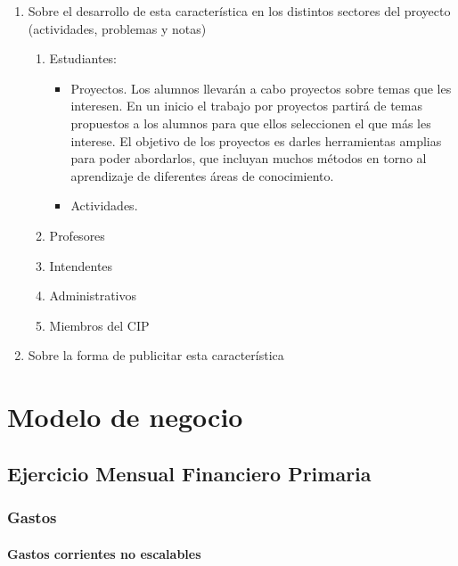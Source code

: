 \documentclass[10pt,letterpaper]{report}
\begin{document}
\begin{enumerate}
\begin{enumerate}[label*=\arabic*.]
\begin{enumerate}[label*=\arabic*.]
Propuesta de definición: la disciplina es el conjunto de hábitos y habilidades que permiten a un individuo o colectivo alcanzar sus metas; o en su defecto, lograr adaptarlas para, con base en la experiencia adquirida, proponer nuevos objetivos concretos (que contenga el espíritu original) y buscar su realización. 

		\item Sobre el desarrollo de esta característica en los distintos sectores del proyecto (actividades, problemas y notas)
			\begin{enumerate}[label*=\arabic*.]
			\item Estudiantes:
		\begin{itemize}
		\item Proyectos. Los alumnos llevar\'an a cabo proyectos sobre temas que les interesen. En un inicio el trabajo por proyectos partir\'a de temas propuestos a los alumnos para que ellos seleccionen el que m\'as les interese. El objetivo de los proyectos es darles herramientas amplias para poder abordarlos, que incluyan muchos métodos en torno al aprendizaje de diferentes áreas de conocimiento.
		\item Actividades.
		\end{itemize}
			\item Profesores
			\item Intendentes
			\item Administrativos
			\item Miembros del CIP
			\end{enumerate}
		\item Sobre la forma de publicitar esta característica
		\end{enumerate}
	\end{enumerate}
\end{enumerate}

\chapter{Modelo de negocio}

\section{Ejercicio Mensual Financiero Primaria}

\subsection{Gastos}

\subsubsection{Gastos corrientes no escalables}
\end{document}
